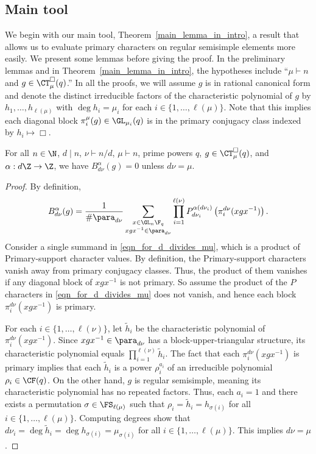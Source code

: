 \subsection{Main tool} \label{reg_ss}

We begin with our main tool, Theorem~\ref{main_lemma_in_intro}, a result that allows us to evaluate primary characters on regular semisimple elements more easily.
We present some lemmas before giving the proof.
In the preliminary lemmas and in Theorem~\ref{main_lemma_in_intro}, the hypotheses include ``\(\mu \vdash n\) and \(g \in \CT_\mu^\Box (q)\).''
In all the proofs, we will assume \(g\) is in rational canonical form and denote the distinct irreducible factors of the characteristic polynomial of \(g\) by \(h_1,\ldots,h_{\ell(\mu)}\) with \(\deg h_i = \mu_i\) for each \(i \in \{1,\ldots,\ell(\mu)\}\).
Note that this implies each diagonal block \(\pi_i^\mu (g) \in \GL_{\mu_i} (q)\) is in the primary conjugacy class indexed by \(h_i \mapsto \Box\).


\begin{lemma}
\label{d_divides_mu}
For all \(n \in \N\), \(d \mid n\), \(\nu \vdash n / d\), \(\mu \vdash n\), prime powers \(q\), \(g \in \CT_\mu^\Box (q)\), and \(\alpha : d \Z \to \Z\), we have \(B_{d\nu}^\alpha(g) = 0\) unless \(d \nu = \mu\).
\end{lemma}
\begin{proof}
By definition,
\begin{equation}
\label{eqn_for_d_divides_mu}
B_{d \nu}^\alpha (g)
=
\frac{1}{\#\para_{d \nu}}
\sum_{\substack{x \in \GL_n \F_q \\ xgx^{-1} \in \para_{d \nu}}}
\prod_{i = 1}^{\ell(\nu)}
P_{d \nu_i}^{\alpha (d \nu_i)} \left (\pi^{d \nu}_i (xgx^{-1}) \right ).
\end{equation}
Consider a single summand in \eqref{eqn_for_d_divides_mu}, which is a product of Primary-support character values.
By definition, the Primary-support characters vanish away from primary conjugacy classes.
Thus, the product of them vanishes if any diagonal block of \(xgx^{-1}\) is not primary.
So assume the product of the $P$ characters in \eqref{eqn_for_d_divides_mu} does not vanish, and hence each block \(\pi_i^{d \nu} (xgx^{-1})\) is primary.

For each \(i \in \{1,\ldots,\ell(\nu)\}\), let \(\tilde{h}_i\) be the characteristic polynomial of \(\pi^{d \nu}_i (xgx^{-1})\).
Since \(xgx^{-1} \in \para_{d \nu}\) has a block-upper-triangular structure, its characteristic polynomial equals \(\prod_{i=1}^{\ell(\nu)} \tilde{h}_i\).
The fact that each \(\pi^{d \nu}_i ( xgx^{-1})\) is primary implies that each \(\tilde{h}_i\) is a power \(\rho_i^{a_i}\) of an irreducible polynomial \(\rho_i \in \CF (q)\).
On the other hand, \(g\) is regular semisimple, meaning its characteristic polynomial has no repeated factors.
Thus, each \(a_i = 1\) and there exists a permutation \(\sigma \in \FS_{\ell(\mu)}\) such that \(\rho_i = \tilde{h}_i = h_{\sigma(i)}\) for all \(i \in \{1,\ldots,\ell(\mu)\}\).
Computing degrees show that \(d \nu_i = \deg \tilde{h}_i = \deg h_{\sigma(i)} = \mu_{\sigma(i)}\) for all \(i \in \{1,\ldots,\ell(\mu)\}\).
This implies \(d \nu = \mu\).
\end{proof}



